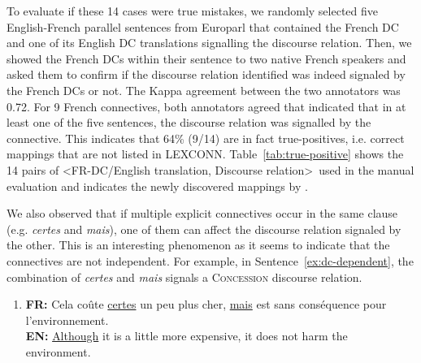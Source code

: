 \documentclass[11pt,a4paper]{article}
\begin{document}
To evaluate if these 14 cases were true mistakes, we randomly selected five English-French parallel sentences from Europarl that contained the French DC and one of its English DC translations signalling the discourse relation. Then, we showed the French DCs within their sentence to two native French speakers and asked them to confirm if the discourse relation identified was indeed signaled  by the French DCs or not. The Kappa agreement between the two annotators was 0.72.
For 9 French connectives, both annotators agreed that 
indicated that in at least one of the five sentences, 
the discourse relation was signalled by the connective.  This indicates that 64\% (9/14) are in fact true-positives, i.e. correct mappings that are not listed in LEXCONN.  Table~\ref{tab:true-positive} shows the 14 pairs of \textless FR-DC/English translation, Discourse relation\textgreater\ used in the manual evaluation and indicates the newly discovered mappings by \checkmark.





We also observed that if multiple explicit connectives occur in the same clause (e.g. \textit{certes} and \textit{mais}), one of them can affect the discourse relation signaled by the other. This is an interesting phenomenon as it seems to indicate that the connectives are not independent. For example, in Sentence~\ref{ex:dc-dependent}, the combination of \textit{certes} and \textit{mais} signals a \textsc{Concession} discourse relation.

\begin{enumerate}[label*=(\arabic*),resume]
    \item \label{ex:dc-dependent} 
    \textbf{FR:} Cela coûte \underline{certes} un peu plus cher, \underline{mais} est sans conséquence pour l'environnement. \\
    \textbf{EN:} \underline{Although} it is a little more expensive, it does not harm the environment.
\end{enumerate}
\end{document}
